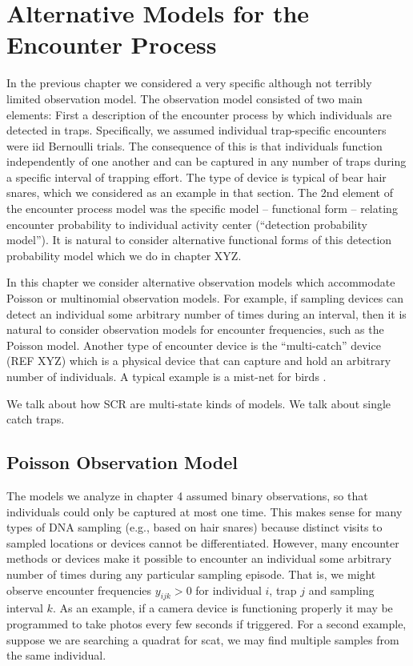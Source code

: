 ﻿\chapter{Alternative Models for the Encounter Process}
\label{chapt.poisson-mn}

In the previous chapter we considered a very specific although not
terribly limited observation model. The observation model consisted of
two main elements: First a description of the encounter process 
by which individuals are detected in traps. Specifically, we 
assumed individual trap-specific encounters were iid Bernoulli
trials. The consequence of this is that individuals function
independently of one another and can be captured in
any number of traps during a specific interval of trapping
effort. The type of device is typical of bear hair snares, which we
considered as an example in that section. The 2nd element of the
encounter process model was the specific model – functional form –
relating encounter probability to individual activity center
(``detection probability model'').  It is natural to consider
alternative functional forms of this detection probability model which
we do in chapter XYZ.

In
this chapter we consider alternative observation models which
accommodate Poisson or multinomial observation models. For example, if
sampling devices can detect an individual some arbitrary number of
times during an interval, then it is natural to consider observation
models for encounter frequencies, such as the Poisson model. Another
type of encounter device is the “multi-catch” device (REF XYZ) which
is a physical device that can capture and hold an arbitrary number of
individuals. A typical example is a mist-net for birds 
\citep{borchers_efford:2008}.

We talk about how SCR are multi-state kinds of models. 
We talk about single catch traps. 


\section{Poisson Observation Model}

The models we analyze in chapter 4 assumed binary observations, so
that individuals could only be captured at most one time.  This makes
sense for many types of DNA sampling (e.g., based on hair snares)
because distinct visits to sampled locations or devices cannot be
differentiated. However, many encounter methods or devices make it
possible to encounter an individual some arbitrary number of times
during any particular sampling episode. That is, we might observe
encounter frequencies $y_{ijk}>0$ for individual $i$, trap $j$ and
sampling interval $k$.  As an example, if a camera device is
functioning properly it may be programmed to take photos every few
seconds if triggered.  For a second example, suppose we are searching
a quadrat for scat, we may find multiple samples from the same
individual.

